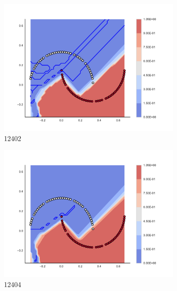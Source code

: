         \begin{figure}[h]\ContinuedFloat
        
\begin{subfigure}[b]{0.09\textwidth}
    \includegraphics[clip, trim=2.35cm 1.75cm 4.5cm 0cm,width=\textwidth]{img/convergence/12402.pdf}
    \caption{12402}
    \label{fig:convergence_12402}
\end{subfigure}
%
\begin{subfigure}[b]{0.09\textwidth}
    \includegraphics[clip, trim=2.35cm 1.75cm 4.5cm 0cm,width=\textwidth]{img/convergence/12404.pdf}
    \caption{12404}
    \label{fig:convergence_12404}
\end{subfigure}
%
\begin{subfigure}[b]{0.09\textwidth}

\end{subfigure}
\end{figure}
